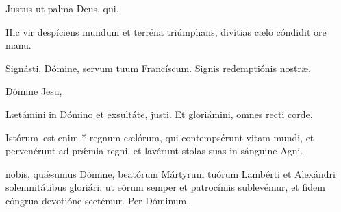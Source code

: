 \documentclass[fontsize=9pt,paper=A6,twoside,BCOR=1mm,DIV=22,headinclude]{scrarticle}
\begin{document}
\begin{multicols}{2}
\V Justus ut palma  Deus, qui, 


\A Hic vir despíciens mundum et terréna triúmphans, divítias cælo cóndidit ore manu.

\V Signásti, Dómine, servum tuum Francíscum.
\R Signis redemptiónis nostræ.

 Dómine Jesu, 






{


\V Lætámini in Dómino et exsultáte, justi.
\R Et gloriámini, omnes recti corde.

 Istórum~est enim * regnum cælórum, qui con\-tem\-psérunt vitam mundi, et pervenérunt ad pr\'æmia regni, et la\-vérunt stolas suas in sánguine Agni.

\vspace{-0.3em}
\vspace{-0.3em}
 nobis, qu\'æsumus Dómine, beatórum Mártyrum tu\-ó\-rum Lambérti et Alexándri solemnitátibus gloriári: ut eórum semper et patrocíniis sublevémur, et fidem cóngrua devotióne sectémur. Per Dóminum.



}


\end{multicols}
\end{document}
